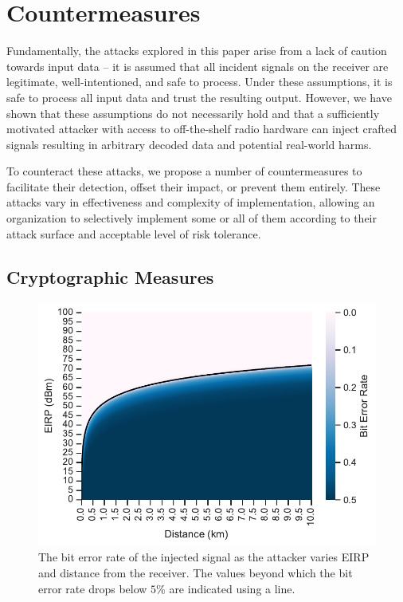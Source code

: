 \section{Countermeasures}\label{sec:countermeasures}

Fundamentally, the attacks explored in this paper arise from a lack of caution towards input data -- it is assumed that all incident signals on the receiver are legitimate, well-intentioned, and safe to process.
Under these assumptions, it is safe to process all input data and trust the resulting output.
However, we have shown that these assumptions do not necessarily hold and that a sufficiently motivated attacker with access to off-the-shelf radio hardware can inject crafted signals resulting in arbitrary decoded data and potential real-world harms.

To counteract these attacks, we propose a number of countermeasures to facilitate their detection, offset their impact, or prevent them entirely.
These attacks vary in effectiveness and complexity of implementation, allowing an organization to selectively implement some or all of them according to their attack surface and acceptable level of risk tolerance.


\subsection{Cryptographic Measures}

\begin{figure}
    \centering
    \includegraphics[width=\columnwidth]{diagrams/distance_eirp_heatmap_95.pdf}
    \caption{The bit error rate of the injected signal as the attacker varies EIRP and distance from the receiver. The values beyond which the bit error rate drops below $5$\% are indicated using a line.}
    \label{fig:distance_eirp}
\end{figure}

